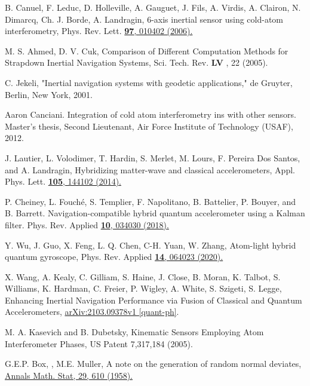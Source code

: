 \documentclass[twocolumn,showpacs,preprintnumbers]{revtex4}
\begin{document}
\begin{thebibliography}{99}
 B. Canuel, F. Leduc, D. Holleville, A. Gauguet, J. Fils, A.
Virdis, A. Clairon, N. Dimarcq, Ch. J. Borde, A. Landragin, 6-axis inertial
sensor using cold-atom interferometry, Phys. Rev. Lett. \href{https://doi.org/10.1103/PhysRevLett.97.010402}%
{\textbf{97}, 010402 (2006).}

 M. S. Ahmed, D. V. Cuk, Comparison of Different Computation
Methods for Strapdown Inertial Navigation Systems, Sci. Tech. Rev. \textbf{LV%
}, 22 (2005).

 C. Jekeli, "Inertial navigation systems with geodetic
applications," de Gruyter, Berlin, New York, 2001.

 Aaron Canciani. Integration of cold atom interferometry ins
with other sensors. Master's thesis, Second Lieutenant, Air Force Institute
of Technology (USAF), 2012.

 J. Lautier, L. Volodimer, T. Hardin, S. Merlet, M. Lours, F.
Pereira Dos Santos, and A. Landragin, Hybridizing matter-wave and classical
accelerometers, Appl. Phys. Lett. \href{https://doi.org/10.1063/1.4897358}{%
\textbf{105}, 144102 (2014).}

 P. Cheiney, L. Fouch\'{e}, S. Templier, F. Napolitano, B.
Battelier, P. Bouyer, and B. Barrett. Navigation-compatible hybrid quantum
accelerometer using a Kalman filter. Phys. Rev. Applied \href{https://doi.org/10.1103/PhysRevApplied.10.034030}%
{\textbf{10}, 034030 (2018).}

 Y. Wu, J. Guo, X. Feng, L. Q. Chen, C-H. Yuan, W. Zhang,
Atom-light hybrid quantum gyroscope, Phys. Rev. Applied \href{https://doi.org/10.1103/PhysRevApplied.14.064023}%
{\textbf{14}, 064023 (2020).}

 X. Wang, A. Kealy, C. Gilliam, S. Haine, J. Close, B. Moran,
K. Talbot, S. Williams, K. Hardman, C. Freier, P. Wigley, A. White, S.
Szigeti, S. Legge, Enhancing Inertial Navigation Performance via Fusion of
Classical and Quantum Accelerometers, \href{https://arxiv.org/abs/2103.09378v1}%
{arXiv:2103.09378v1 [quant-ph]}.

 M. A. Kasevich and B. Dubetsky, Kinematic Sensors Employing
Atom Interferometer Phases, US Patent 7,317,184 (2005).

 G.E.P. Box, , M.E. Muller, A note on the generation of random
normal deviates, \href{https://projecteuclid.org/journals/annals-of-mathematical-statistics/volume-29/issue-2/A-Note-on-the-Generation-of-Random-Normal-Deviates/10.1214/aoms/1177706645.full}%
{Annals Math. Stat, 29, 610 (1958).}


\end{thebibliography}
\end{document}
